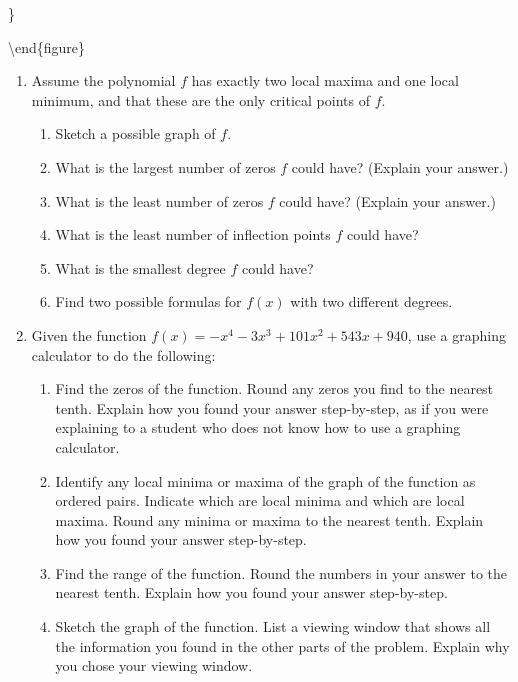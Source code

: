 \documentclass[
]{book}
\providecommand{\tightlist}{%
  \setlength{\itemsep}{0pt}\setlength{\parskip}{0pt}}
\theoremstyle{definition}
\theoremstyle{definition}
\theoremstyle{definition}
\theoremstyle{definition}
\theoremstyle{remark}
\begin{document}
\}

\textbackslash end\{figure\}

\begin{enumerate}
\def\labelenumi{\arabic{enumi}.}
\item
  Assume the polynomial \(f\) has exactly two local maxima and one local minimum, and that these are the only critical points of \(f\).

  \begin{enumerate}
  \def\labelenumii{\alph{enumii}.}
  \tightlist
  \item
    Sketch a possible graph of \(f\).
  \item
    What is the largest number of zeros \(f\) could have? (Explain your answer.)
  \item
    What is the least number of zeros \(f\) could have? (Explain your answer.)
  \item
    What is the least number of inflection points \(f\) could have?
  \item
    What is the smallest degree \(f\) could have?
  \item
    Find two possible formulas for \(f(x)\) with two different degrees.
  \end{enumerate}
\item
  Given the function \(f(x)=-x^4-3x^3+101x^2+543x+940\), use a graphing calculator to do the following:

  \begin{enumerate}
  \def\labelenumii{\alph{enumii}.}
  \tightlist
  \item
    Find the zeros of the function. Round any zeros you find to the nearest tenth. Explain how you found your answer step-by-step, as if you were explaining to a student who does not know how to use a graphing calculator.
  \item
    Identify any local minima or maxima of the graph of the function as ordered pairs. Indicate which are local minima and which are local maxima. Round any minima or maxima to the nearest tenth. Explain how you found your answer step-by-step.
  \item
    Find the range of the function. Round the numbers in your answer to the nearest tenth. Explain how you found your answer step-by-step.
  \item
    Sketch the graph of the function. List a viewing window that shows all the information you found in the other parts of the problem. Explain why you chose your viewing window.
  \end{enumerate}
\end{enumerate}
\end{document}
